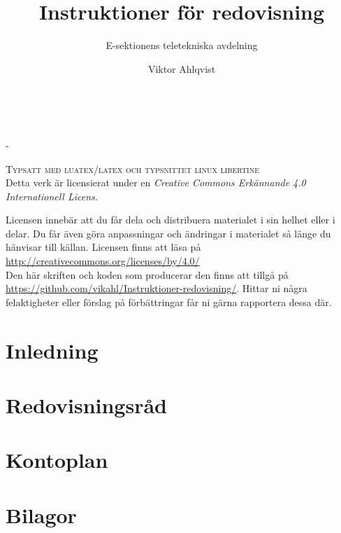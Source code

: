 \documentclass[%
	a4paper,
	twoside,
	titlepage,
	swedish,
	DIV=7,
	final,
	]{scrbook}
\title{Instruktioner för redovisning}
\author{E-sektionens teletekniska avdelning}
\author{Viktor Ahlqvist}
\newlength{\overhang}
\begin{document}
	\frontmatter

	\makeatletter
	\begin{titlepage}
		\begin{flushright}
			\vspace*{0.45\textheight}
			{\Large \@title \\}
			{\scshape \@author}
		\end{flushright}


	\end{titlepage}
	\makeatother

	\newpage
	\begin{addmargin*}[0em]{-\overhang}
		~\vfill
		\thispagestyle{empty}

		\textsc{Typsatt med luatex/latex och typsnittet linux libertine}\\[2\baselineskip]

		Detta verk är licensierat under en \emph{Creative Commons Erkännande 4.0 Internationell Licens.}

		Licensen innebär att du får dela och distribuera materialet i sin helhet eller i delar. Du får även göra anpassningar och ändringar i materialet så länge du hänvisar till källan. Licensen finns att läsa på \url{http://creativecommons.org/licenses/by/4.0/}\\[1.2\baselineskip]

		Den här skriften och koden som producerar den finns att tillgå på \url{https://github.com/vikahl/Instruktioner-redovisning/}. Hittar ni några felaktigheter eller förslag på förbättringar får ni gärna rapportera dessa där.
	\end{addmargin*}

	
	\tableofcontents	%
	
	\mainmatter
	\part{Inledning}
	

	\part{Redovisningsråd}
	
	
	\part{Kontoplan}
	

	\backmatter
	\appendix
	\part{Bilagor}
	
	
\end{document}

